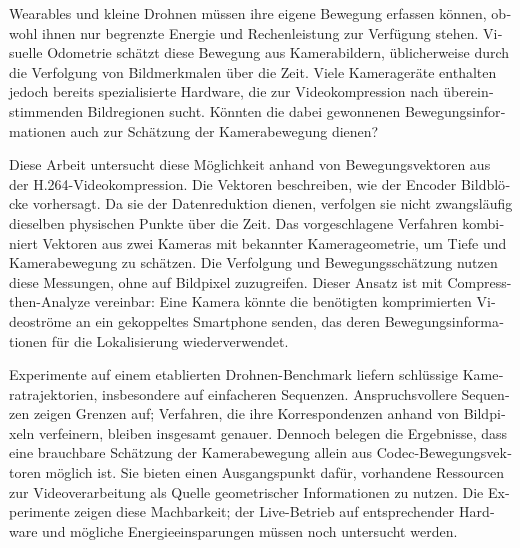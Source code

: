 \begin{otherlanguage}{ngerman}

Wearables und kleine Drohnen müssen ihre eigene Bewegung erfassen können,
obwohl ihnen nur begrenzte Energie und Rechenleistung zur Verfügung stehen.
Visuelle Odometrie schätzt diese Bewegung aus Kamerabildern, üblicherweise
durch die Verfolgung von Bildmerkmalen über die Zeit. Viele Kamerageräte
enthalten jedoch bereits spezialisierte Hardware, die zur Videokompression
nach übereinstimmenden Bildregionen sucht. Könnten die dabei gewonnenen
Bewegungsinformationen auch zur Schätzung der Kamerabewegung dienen?

Diese Arbeit untersucht diese Möglichkeit anhand von Bewegungsvektoren
aus der H.264-Videokompression. Die Vektoren beschreiben, wie der Encoder
Bildblöcke vorhersagt. Da sie der Datenreduktion dienen, verfolgen sie nicht
zwangsläufig dieselben physischen Punkte über die Zeit. Das vorgeschlagene
Verfahren kombiniert Vektoren aus zwei Kameras mit bekannter Kamerageometrie,
um Tiefe und Kamerabewegung zu schätzen. Die Verfolgung und Bewegungsschätzung
nutzen diese Messungen, ohne auf Bildpixel zuzugreifen. Dieser Ansatz ist
mit Compress-then-Analyze vereinbar: Eine Kamera könnte die benötigten
komprimierten Videoströme an ein gekoppeltes Smartphone senden, das deren
Bewegungsinformationen für die Lokalisierung wiederverwendet.

Experimente auf einem etablierten Drohnen-Benchmark liefern schlüssige
Kameratrajektorien, insbesondere auf einfacheren Sequenzen. Anspruchsvollere
Sequenzen zeigen Grenzen auf; Verfahren, die ihre Korrespondenzen anhand von
Bildpixeln verfeinern, bleiben insgesamt genauer. Dennoch belegen die
Ergebnisse, dass eine brauchbare Schätzung der Kamerabewegung allein aus
Codec-Bewegungsvektoren möglich ist. Sie bieten einen Ausgangspunkt dafür,
vorhandene Ressourcen zur Videoverarbeitung als Quelle geometrischer
Informationen zu nutzen. Die Experimente zeigen diese Machbarkeit; der
Live-Betrieb auf entsprechender Hardware und mögliche Energieeinsparungen
müssen noch untersucht werden.

\end{otherlanguage}


\makeatletter
{}
{\renewcommand{\abstractname}{Abstract}}
{\renewcommand{\abstractname}{Kurzfassung}}
\makeatother
